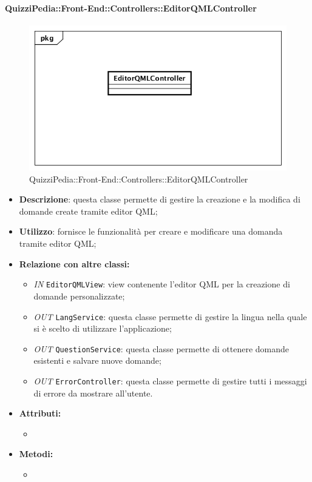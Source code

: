 \paragraph{QuizziPedia::Front-End::Controllers::EditorQMLController}
\begin{figure}
	\centering
	\includegraphics[scale=0.45]{UML/Classi/Front-End/QuizziPedia_Front-end_Controller_EditorQMLController.png}
	\caption{QuizziPedia::Front-End::Controllers::EditorQMLController}
\end{figure}
\begin{itemize}
	\item \textbf{Descrizione}: questa classe permette di gestire la creazione e la modifica di domande create tramite editor QML;
	\item \textbf{Utilizzo}: fornisce le funzionalità per creare e modificare una domanda tramite editor QML;
	\item \textbf{Relazione con altre classi:}
	\begin{itemize}
		\item \textit{IN} \texttt{EditorQMLView}: view contenente l'editor QML per la creazione di domande personalizzate; 
		\item \textit{OUT} \texttt{LangService}: questa classe permette di gestire la lingua nella quale si è scelto di utilizzare l'applicazione;
		\item \textit{OUT} \texttt{QuestionService}: questa classe permette di ottenere domande esistenti e salvare nuove domande;
		\item \textit{OUT} \texttt{ErrorController}: questa classe permette di gestire tutti i messaggi di errore da mostrare all'utente.
	\end{itemize}
	\item \textbf{Attributi:}
	\begin{itemize}
		\item 
	\end{itemize}
	\item \textbf{Metodi:}
	\begin{itemize}
		\item 
	\end{itemize}
\end{itemize}

